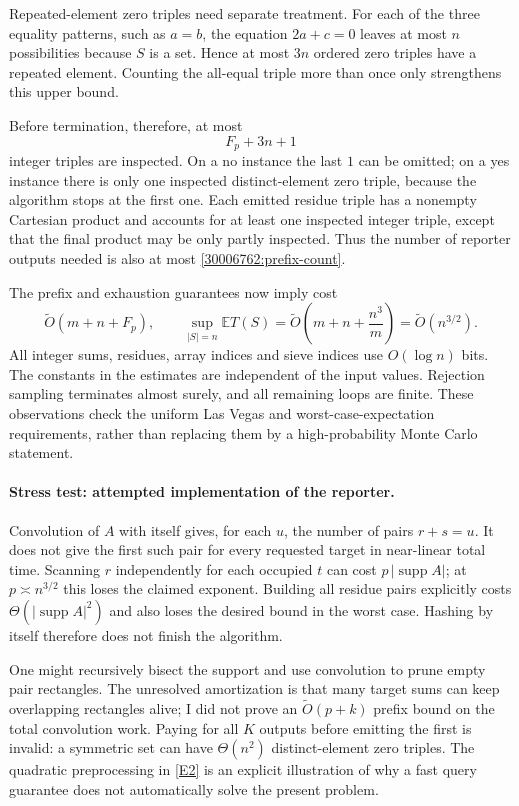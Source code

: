 \documentclass[11pt,a4paper]{article}
\newcommand{\E}{\mathbb{E}}
\newcommand{\eref}[2]{\hyperlink{extra:#1:#2}{[E#2]}}
\numberwithin{equation}{section}
\begin{document}
Repeated-element zero triples need separate treatment. For each of the
three equality patterns, such as $a=b$, the equation $2a+c=0$ leaves at
most $n$ possibilities because $S$ is a set. Hence at most $3n$ ordered
zero triples have a repeated element. Counting the all-equal triple more
than once only strengthens this upper bound.

Before termination, therefore, at most
\begin{equation}\label{30006762:prefix-count}
 F_p+3n+1
\end{equation}
integer triples are inspected. On a no instance the last $1$ can be
omitted; on a yes instance there is only one inspected distinct-element
zero triple, because the algorithm stops at the first one. Each emitted
residue triple has a nonempty Cartesian product and accounts for at
least one inspected integer triple, except that the final product may
be only partly inspected. Thus the number of reporter outputs needed is
also at most \eqref{30006762:prefix-count}.

The prefix and exhaustion guarantees now imply cost
\[
 \widetilde O(m+n+F_p),\qquad
 \sup_{|S|=n}\E T(S)
 =\widetilde O\left(m+n+\frac{n^3}{m}\right)
 =\widetilde O(n^{3/2}).
\]
All integer sums, residues, array indices and sieve indices use
$O(\log n)$ bits. The constants in the estimates are independent of the
input values. Rejection sampling terminates almost surely, and all
remaining loops are finite. These observations check the uniform
Las Vegas and worst-case-expectation requirements, rather than replacing
them by a high-probability Monte Carlo statement.

\paragraph{Stress test: attempted implementation of the reporter.}
Convolution of $A$ with itself gives, for each $u$, the number of pairs
$r+s=u$. It does not give the first such pair for every requested target
in near-linear total time. Scanning $r$ independently for each occupied
$t$ can cost $p\,|\operatorname{supp}A|$; at
$p\asymp n^{3/2}$ this loses the claimed exponent. Building all residue
pairs explicitly costs $\Theta(|\operatorname{supp}A|^2)$ and also loses
the desired bound in the worst case. Hashing by itself therefore does
not finish the algorithm.

One might recursively bisect the support and use convolution to prune
empty pair rectangles. The unresolved amortization is that many target
sums can keep overlapping rectangles alive; I did not prove an
$\widetilde O(p+k)$ prefix bound on the total convolution work. Paying
for all $K$ outputs before emitting the first is invalid: a symmetric
set can have $\Theta(n^2)$ distinct-element zero triples. The quadratic
preprocessing in \eref{30006762}{2} is an explicit illustration of why a fast
query guarantee does not automatically solve the present problem.
\end{document}
